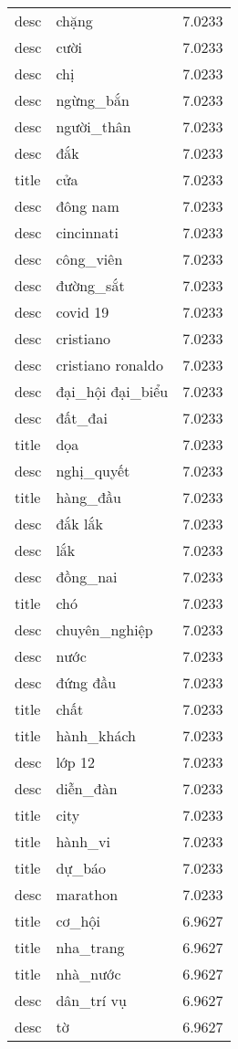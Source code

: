 \documentclass{article}
\begin{document}
\begin{tabular}{lll}
desc & chặng & 7.0233\\
desc & cười & 7.0233\\
desc & chị & 7.0233\\
desc & ngừng\_bắn & 7.0233\\
desc & người\_thân & 7.0233\\
desc & đắk & 7.0233\\
title & cửa & 7.0233\\
desc & đông nam & 7.0233\\
desc & cincinnati & 7.0233\\
desc & công\_viên & 7.0233\\
desc & đường\_sắt & 7.0233\\
desc & covid 19 & 7.0233\\
desc & cristiano & 7.0233\\
desc & cristiano ronaldo & 7.0233\\
desc & đại\_hội đại\_biểu & 7.0233\\
desc & đất\_đai & 7.0233\\
title & dọa & 7.0233\\
desc & nghị\_quyết & 7.0233\\
title & hàng\_đầu & 7.0233\\
desc & đắk lắk & 7.0233\\
desc & lắk & 7.0233\\
desc & đồng\_nai & 7.0233\\
title & chó & 7.0233\\
desc & chuyên\_nghiệp & 7.0233\\
desc & nước & 7.0233\\
desc & đứng đầu & 7.0233\\
title & chất & 7.0233\\
title & hành\_khách & 7.0233\\
desc & lớp 12 & 7.0233\\
desc & diễn\_đàn & 7.0233\\
title & city & 7.0233\\
title & hành\_vi & 7.0233\\
title & dự\_báo & 7.0233\\
desc & marathon & 7.0233\\
title & cơ\_hội & 6.9627\\
title & nha\_trang & 6.9627\\
title & nhà\_nước & 6.9627\\
desc & dân\_trí vụ & 6.9627\\
desc & tờ & 6.9627\\

\end{tabular}
\end{document}
